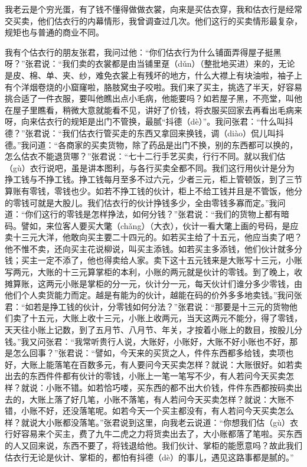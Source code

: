 \documentclass[12pt,UTF8]{ctexbook}
\begin{document}
我老云是个穷光蛋，有了钱不懂得做做衣裳，向来是买估衣穿，我和估衣行是经常交买卖，他们估衣行的内幕情形，我曾调查过几次。他们这行的买卖情形最复杂，规矩也与普通的商业不同。

我有个估衣行的朋友张君，我问过他：“你们估衣行为什么铺面弄得屋子挺黑呀？”张君说：“我们卖的衣裳都是由当铺里趸（dǔn）（整批地买进）来的，无论是皮、棉、单、夹、纱，难免衣裳上有残坏的地方，什么大襟上有块油啦，袖子上有个洋烟卷烧的小窟窿啦，胳肢窝虫子咬啦。我们来了买主，挑选了半天，好容易挑合适了一件衣服，要叫他瞧出点小毛病，他能要吗？如若屋子黑，不亮堂，叫他在屋子里瞧看，稍微大意就能看不见，讲好了价钱，将衣服买回家去再看出毛病来呀，向来估衣行的规矩是出门不管换，最腻“抖德（dè）”。我问张君：“什么叫抖德？”张君说：“我们估衣行管买走的东西又拿回来换钱，调（diào）侃儿叫抖德。”我问道：“各商家的买卖货物，除了药品是出门不换，别的东西都可以换的，怎么估衣不能退货哪？”张君说：“七十二行手艺买卖，行行不同。就以我们估（gù）衣行说吧，虽是讲本图利，与各行买卖全都不同。我们这行用伙计是分为挣工钱与不挣工钱。挣工钱每月至多不过六元，少者三元，柜上管顿饭，到了三节算账有零钱，零钱也少。如若不挣工钱的伙计，柜上不给工钱并且是不管饭，他分的零钱可就是大股儿。我们估衣行的伙计挣钱多少，全由零钱多寡而定。”我问道：“你们这行的零钱是怎样挣法，如何分钱？”张君说：“我们的货物上都有暗码。譬如，来位客人要买大氅（chǎng）（大衣），伙计一看大氅上画的号码，是应卖十三元大洋，他敢向买主要二十四元的。如若买主给了十五元，他应当卖了吧？他不惟不卖，还向买主花说柳说，叫买主添钱。如若买主多添钱，他们伙计就多分钱；买主一定不添了，他也得卖给人家。卖下这十五元钱来是大账写十三元，小账写两元，大账的十三元算掌柜的本利，小账的两元就是伙计的零钱。到了晚上，收摊算账，这两元小账是掌柜的分一元，伙计分一元，每天伙计们谁分多少零钱，由他们个人卖货能力而定。越是有能为的伙计，越能在码的价外多多地卖钱。”我问张君：“如若是挣工钱的伙计，分零钱如何分法？”张君说：“那要是十三元的货物他们卖了十五元，大账上收十三元，小账上收两元，当天这两元不能分，得了零钱，天天往小账上记数，到了五月节、八月节、年关，才按着小账上的数目，按股儿分钱。”我又问张君：“我常听贵行人说，大账好，小账好，大账不好小账也不好，那是怎么回事？”张君说：“譬如，今天来的买货之人，件件东西都多给钱，卖项也好，大账上能落笔在百数多元，有人要问今天买卖怎样？就说：大账很好。如若卖出去的东西件件都有伙计的零钱，小账上一笔一笔写不少，有人若问今天买卖怎样？就说：小账不错。如若恰巧喽，买东西的都不出大价钱，件件东西都按码卖出去的，大账上落了好几笔，小账不落笔，有人若问今天买卖怎样？就说：大账不错，小账不好，还没落笔呢。如若今天一个买主都没有，有人若问今天买卖怎么样？就说大小账都没落笔。”张君说到这里，向我老云说道：“你想我们估（gù）衣行好容易来个买主，费了九牛二虎之力将货卖出去了，大小账都落了笔啦。买东西的人又回来说，东西不要了，将钱退给他。我们伙计、掌柜的能愿意吗？故此我们估衣行无论是伙计、掌柜的，都怕有抖德（dè）的事儿，遇见这路事都是腻的。”
\end{document}
